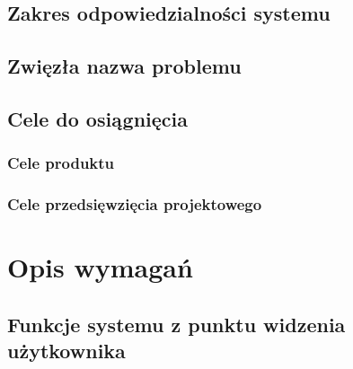 \documentclass[paper=a4, fontsize=12pt]{scrartcl}
\numberwithin{equation}{section}		%
\numberwithin{figure}{section}			%
\numberwithin{table}{section}				%
\begin{document}
	\subsection{Zakres odpowiedzialności systemu}
		

	\subsection{Zwięzła nazwa problemu}
		

	\subsection{Cele do osiągnięcia}

		\subsubsection{Cele produktu}
			

		\subsubsection{Cele przedsięwzięcia projektowego}
			

\section{Opis wymagań}


	\subsection{Funkcje systemu z punktu widzenia użytkownika}
		
\end{document}
